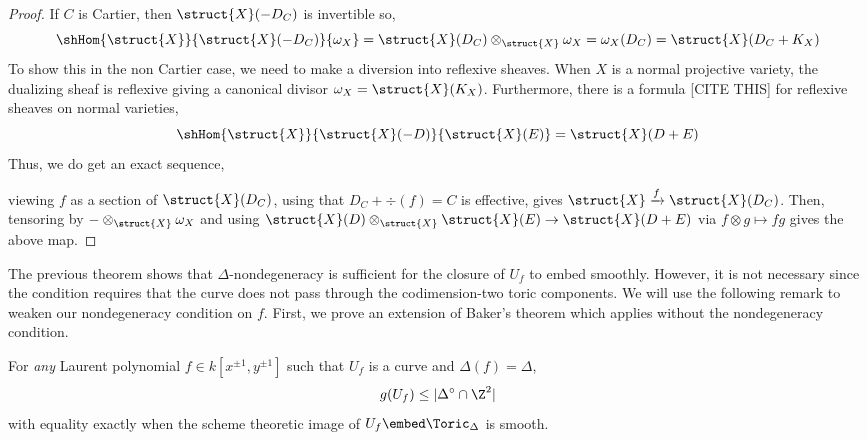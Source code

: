 \documentclass[12pt]{article}
\begin{document}
\begin{proof}
If $C$ is Cartier, then $\struct{X}(-D_C)$ is invertible so,
\[ \shHom{\struct{X}}{\struct{X}(-D_C)}{\omega_X} = \struct{X}(D_C) \otimes_{\struct{X}} \omega_X = \omega_X(D_C) = \struct{X}(D_C + K_X) \]
To show this in the non Cartier case, we need to make a diversion into reflexive sheaves. When $X$ is a normal projective variety, the dualizing sheaf is reflexive giving a canonical divisor $\omega_X = \struct{X}(K_X)$. Furthermore, there is a formula [CITE THIS] for reflexive sheaves on normal varieties,
\[ \shHom{\struct{X}}{\struct{X}(-D)}{\struct{X}(E)} = \struct{X}(D + E) \]
Thus, we do get an exact sequence,
\begin{center}
\end{center}
viewing $f$ as a section of $\struct{X}(D_C)$, using that $D_C + \div{(f)} = C$ is effective, gives $\struct{X} \xrightarrow{f} \struct{X}(D_C)$. Then, tensoring by $- \otimes_{\struct{X}} \omega_X$ and using $\struct{X}(D) \otimes_{\struct{X}} \struct{X}(E) \to \struct{X}(D + E)$ via $f \otimes g \mapsto fg$ gives the above map.
\end{proof}

\noindent
The previous theorem shows that $\Delta$-nondegeneracy is sufficient for the closure of $U_f$ to embed smoothly. However, it is not necessary since the condition requires that the curve does not pass through the codimension-two toric components. We will use the following remark to weaken our nondegeneracy condition on $f$. First, we prove an extension of Baker's theorem which applies without the nondegeneracy condition.

\begin{thm} \label{baker_refinement}
For \textit{any} Laurent polynomial $f \in k[x^{\pm 1}, y^{\pm 1}]$ such that $U_f$ is a curve and $\Delta(f) = \Delta$,
\[ g(U_f) \le | \Delta^\circ \cap \Z^2 | \]
with equality exactly when the scheme theoretic image of $U_f \embed \Toric_\Delta$ is smooth. 
\end{thm}
\end{document}
